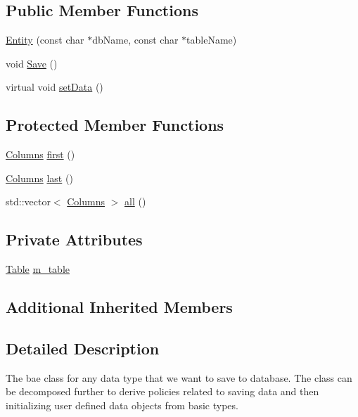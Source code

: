\subsection*{Public Member Functions}
\begin{DoxyCompactItemize}
\item 
\mbox{\hyperlink{classEntity_a123f776b73726fba47ee376b2f903ea7}{Entity}} (const char $\ast$db\+Name, const char $\ast$table\+Name)
\item 
void \mbox{\hyperlink{classEntity_adb45cf2a74f4ce58b340b70e1727c8e5}{Save}} ()
\item 
virtual void \mbox{\hyperlink{classEntity_a0f8088e06ee1aae86e0a8049e371692f}{set\+Data}} ()
\end{DoxyCompactItemize}
\subsection*{Protected Member Functions}
\begin{DoxyCompactItemize}
\item 
\mbox{\hyperlink{classColumns}{Columns}} \mbox{\hyperlink{classEntity_a3b769f023811c9f6d8b6d18305173703}{first}} ()
\item 
\mbox{\hyperlink{classColumns}{Columns}} \mbox{\hyperlink{classEntity_a55872541f5b73a8cef49eda0368c770c}{last}} ()
\item 
std\+::vector$<$ \mbox{\hyperlink{classColumns}{Columns}} $>$ \mbox{\hyperlink{classEntity_aae8be1f7e39217b5abf629e5149958c5}{all}} ()
\end{DoxyCompactItemize}
\subsection*{Private Attributes}
\begin{DoxyCompactItemize}
\item 
\mbox{\hyperlink{classTable}{Table}} \mbox{\hyperlink{classEntity_a7492e529485203a402122b8f3e09dfb6}{m\+\_\+table}}
\end{DoxyCompactItemize}
\subsection*{Additional Inherited Members}


\subsection{Detailed Description}
The bae class for any data type that we want to save to database. The class can be decomposed further to derive policies related to saving data and then initializing user defined data objects from basic types. 

